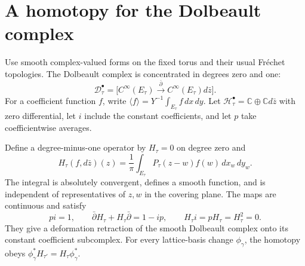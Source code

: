 \section{A homotopy for the Dolbeault complex}

Use smooth complex-valued forms on the fixed torus and their usual Fr\'echet topologies.
The Dolbeault complex is concentrated in degrees zero and one:
\[
 \mathcal D_\tau^\bullet=
 \bigl[C^\infty(E_\tau)\xrightarrow{\bar\partial}
       C^\infty(E_\tau)d\bar z\bigr].
\]
For a coefficient function $f$, write
$\langle f\rangle=Y^{-1}\int_{E_\tau}f\,dx\,dy$.
Let $\mathcal H_\tau^\bullet=\mathbb C\oplus\mathbb C d\bar z$ with zero differential, let $i$ include the constant coefficients, and let $p$ take coefficientwise averages.

\begin{theorem}\label{thm:ep-homotopy}
Define a degree-minus-one operator by $H_\tau=0$ on degree zero and
\begin{equation}\label{eq:ep-H}
 H_\tau(f,d\bar z)(z)=\frac1\pi
             \int_{E_\tau}P_\tau(z-w)f(w)\,dx_w\,dy_w.
\end{equation}
The integral is absolutely convergent, defines a smooth function, and is independent of representatives of $z,w$ in the covering plane.
The maps are continuous and satisfy
\[
 p i=1,\qquad \bar\partial H_\tau+H_\tau\bar\partial=1-ip,
 \qquad H_\tau i=pH_\tau=H_\tau^2=0.
\]
They give a deformation retraction of the smooth Dolbeault complex onto its constant coefficient subcomplex.
For every lattice-basis change $\phi_\gamma$, the homotopy obeys
$\phi_\gamma^*H_{\tau'}=H_\tau\phi_\gamma^*$.
\end{theorem}
